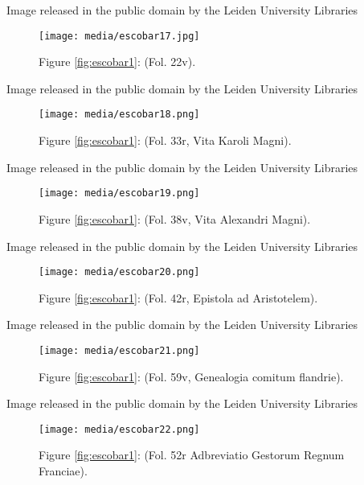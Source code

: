 \documentclass{article}
\begin{document}
 Image released in the public domain by the Leiden University Libraries 


   \begin{figure}[H]
  \centering
    \texttt{[image: media/escobar17.jpg]}
    \caption{Figure \ref{fig:escobar1}: (Fol. 22v).}
    \label{fig:escobar17}
  \end{figure}

 Image released in the public domain by the Leiden University Libraries 


   \begin{figure}
    \texttt{[image: media/escobar18.png]}
    \caption{Figure \ref{fig:escobar1}: (Fol. 33r, Vita Karoli Magni).}
    \label{fig:escobar18}
\end{figure}

 Image released in the public domain by the Leiden University Libraries 


\begin{figure}[H]
  \centering
    \texttt{[image: media/escobar19.png]}
    \caption{Figure \ref{fig:escobar1}: (Fol. 38v, Vita Alexandri Magni).}
    \label{fig:escobar19}
  \end{figure}

 Image released in the public domain by the Leiden University Libraries 


  \begin{figure}
    \texttt{[image: media/escobar20.png]}
    \caption{Figure \ref{fig:escobar1}: (Fol. 42r, Epistola ad Aristotelem).}
    \label{fig:escobar20}
\end{figure}

 Image released in the public domain by the Leiden University Libraries 


\begin{figure}[H]
  \centering
  \texttt{[image: media/escobar21.png]}
    \caption{Figure \ref{fig:escobar1}: (Fol. 59v, Genealogia comitum flandrie).}
    \label{fig:escobar21}
  \end{figure}

 Image released in the public domain by the Leiden University Libraries 


\begin{figure}[H]
  \centering
    \texttt{[image: media/escobar22.png]}
    \caption{Figure \ref{fig:escobar1}: (Fol. 52r Adbreviatio Gestorum Regnum \\Franciae).}
    \label{fig:escobar22}
  \end{figure}
\end{document}
